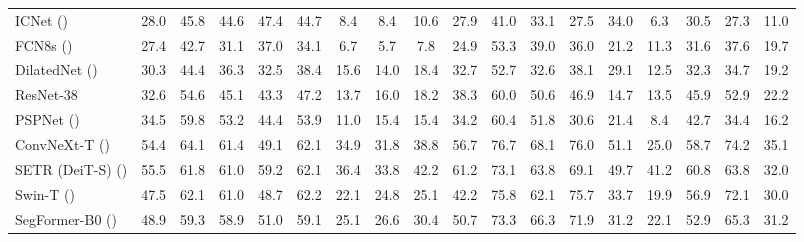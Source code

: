 \documentclass[nohyperref]{article}
\theoremstyle{plain}
\theoremstyle{definition}
\theoremstyle{remark}
\begin{document}
\begin{table*}[h!]
\begin{savenotes}
\begin{minipage*}{1.0\textwidth}
{\begin{tabular}{l|c|cccc|cccc|cccc|cccc}
\midrule
\multicolumn{1}{l|}{ICNet (\citeauthor{zhao2018icnet})} & \multicolumn{1}{c|}{28.0} & 45.8 & 44.6 & 47.4 & \multicolumn{1}{c|}{44.7} & 8.4 & 8.4 & 10.6 & \multicolumn{1}{c|}{27.9} & 41.0 & 33.1 & 27.5 & \multicolumn{1}{c|}{34.0} & 6.3 & 30.5 & 27.3 & 11.0 \\
\multicolumn{1}{l|}{FCN8s (\citeauthor{long2015fully})} & \multicolumn{1}{c|}{27.4} & 42.7 & 31.1 & 37.0 & \multicolumn{1}{c|}{34.1} & 6.7 & 5.7 & 7.8 & \multicolumn{1}{c|}{24.9} & 53.3 & 39.0 & 36.0 & \multicolumn{1}{c|}{21.2} & 11.3 & 31.6 & 37.6 & 19.7 \\
\multicolumn{1}{l|}{DilatedNet (\citeauthor{yu2015multi})} & \multicolumn{1}{c|}{30.3} & 44.4 & 36.3 & 32.5 & \multicolumn{1}{c|}{38.4} & 15.6 & 14.0 & 18.4 & \multicolumn{1}{c|}{32.7} & 52.7 & 32.6 & 38.1 & \multicolumn{1}{c|}{29.1} & 12.5 & 32.3 & 34.7 & 19.2 \\
\multicolumn{1}{l|}{ResNet-38} & \multicolumn{1}{c|}{32.6} & 54.6 & 45.1 & 43.3 & \multicolumn{1}{c|}{47.2} & 13.7 & 16.0 & 18.2 & \multicolumn{1}{c|}{38.3} & 60.0 & 50.6 & 46.9 & \multicolumn{1}{c|}{14.7} & 13.5 & 45.9 & 52.9 & 22.2 \\
\multicolumn{1}{l|}{PSPNet (\citeauthor{zhao2017pyramid})} & \multicolumn{1}{c|}{34.5} & 59.8 & 53.2 & 44.4 & \multicolumn{1}{c|}{53.9} & 11.0 & 15.4 & 15.4 & \multicolumn{1}{c|}{34.2} & 60.4 & 51.8 & 30.6 & \multicolumn{1}{c|}{21.4} & 8.4 & 42.7 & 34.4 & 16.2 \\
\multicolumn{1}{l|}{ConvNeXt-T (\citeauthor{liu2022convnet})} & \multicolumn{1}{c|}{54.4} & 64.1 & 61.4 & 49.1 & \multicolumn{1}{c|}{62.1} & 34.9 & 31.8 & 38.8 & \multicolumn{1}{c|}{56.7} & 76.7 & 68.1 & 76.0 & 51.1 & \multicolumn{1}{c}{25.0} & 58.7 & 74.2 & 35.1  \\
\midrule
\multicolumn{1}{l|}{SETR (DeiT-S) (\citeauthor{zheng2021rethinking})}& \multicolumn{1}{c|}{{55.5}} & {61.8}  & {61.0}  & {59.2}  & \multicolumn{1}{c|}{{62.1}} & {36.4}  & {33.8}  & {42.2}  & \multicolumn{1}{c|}{{61.2}} & {73.1} &{63.8}  & {69.1}   & \multicolumn{1}{c|}{{49.7}}   & {41.2}  & {60.8} & 63.8  & {32.0}  \\
\multicolumn{1}{l|}{Swin-T (\citeauthor{liu2021swin})}& \multicolumn{1}{c|}{{47.5}} & {62.1}  & {61.0}  & {48.7}  & \multicolumn{1}{c|}{{62.2}} & {22.1}  & {24.8}  & {25.1}  & \multicolumn{1}{c|}{{42.2}} & {75.8} & {62.1}  & {75.7}   & \multicolumn{1}{c|}{{{33.7}}}   & {19.9}  & 56.9 & {72.1}  & {30.0}  \\
\multicolumn{1}{l|}{SegFormer-B0 (\citeauthor{xie2021segformer})}& \multicolumn{1}{c|}{{48.9}} & {59.3}  & {58.9}  & {51.0}  & \multicolumn{1}{c|}{{59.1}} & {25.1}  & 26.6 & {30.4}  & {50.7}  & \multicolumn{1}{c}{{73.3}} & 66.3 & {71.9}  & {31.2}    & \multicolumn{1}{c}{{22.1}} & {52.9}  & {65.3}  & {31.2}  \\

\end{tabular}}
\end{minipage*}
\end{savenotes}
\end{table*}
\end{document}
